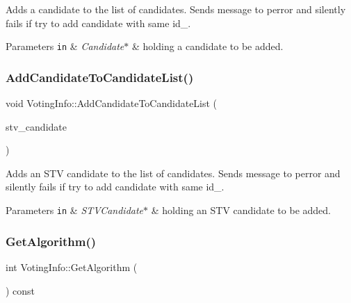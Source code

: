 Adds a candidate to the list of candidates. Sends message to perror and silently fails if try to add candidate with same id\+\_\+. 


\begin{DoxyParams}[1]{Parameters}
\mbox{\tt in}  & {\em Candidate$\ast$} & holding a candidate to be added. \\
\hline
\end{DoxyParams}
\mbox{\label{classVotingInfo_a18d8dfef16797ef988a296d5ef28c852}} 
\subsubsection{\texorpdfstring{Add\+Candidate\+To\+Candidate\+List()}{AddCandidateToCandidateList()}\hspace{0.1cm}{\footnotesize\ttfamily [2/2]}}
{\footnotesize\ttfamily void Voting\+Info\+::\+Add\+Candidate\+To\+Candidate\+List (\begin{DoxyParamCaption}\item[{\hyperlink{classSTVCandidate}{S\+T\+V\+Candidate} $\ast$}]{stv\+\_\+candidate }\end{DoxyParamCaption})}



Adds an S\+TV candidate to the list of candidates. Sends message to perror and silently fails if try to add candidate with same id\+\_\+. 


\begin{DoxyParams}[1]{Parameters}
\mbox{\tt in}  & {\em S\+T\+V\+Candidate$\ast$} & holding an S\+TV candidate to be added. \\
\hline
\end{DoxyParams}
\mbox{\label{classVotingInfo_a2d0abd1d9be36bfd9fb734dfa644b8e1}} 
\subsubsection{\texorpdfstring{Get\+Algorithm()}{GetAlgorithm()}}
{\footnotesize\ttfamily int Voting\+Info\+::\+Get\+Algorithm (\begin{DoxyParamCaption}{ }\end{DoxyParamCaption}) const}



